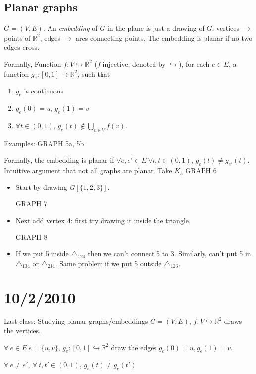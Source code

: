 \documentclass{article}
\begin{document}
\subsection*{Planar graphs}
 $G= (V,E)$.  An \emph{embedding} of $G$ in the plane is just a drawing of $G$.  vertices $\rightarrow$ points of $\mathbb{R}^2$, edges $\rightarrow$ arcs connecting points.  The embedding is planar if no two edges cross.

Formally, Function $f: V \hookrightarrow \mathbb{R}^2$ ($f$ injective, denoted by $\hookrightarrow$), for each $e\in E$, a function $g_e: [0,1] \rightarrow \mathbb{R}^2$, such that 
\begin{enumerate}
 \item $g_e$ is continuous
\item $g_e(0)=u$, $g_e(1)=v$
\item $\forall t \in (0,1)$, $g_e(t) \notin \displaystyle \bigcup_{v \in V} f(v)$.
\end{enumerate}

Examples: GRAPH 5a, 5b

Formally, the embedding is planar if $\forall e, e' \in E ~\forall t, t \in (0,1)$, $g_e(t) \neq g_{e'}(t)$.  Intuitive argument that not all graphs are planar.  Take $K_5$ GRAPH 6
\begin{itemize}
\item Start by drawing $G[\{1,2,3\}]$.

GRAPH 7
\item Next add vertex 4: first try drawing it inside the triangle.

GRAPH 8 

\item If we put 5 inside $\triangle_{124}$ then we can't connect 5 to 3.  Similarly, can't put 5 in $\triangle_{134}$ or $\triangle_{234}$.  Same problem if we put 5 outside $\triangle_{123}$.
\end{itemize}

\section*{10/2/2010}

Last class: Studying planar graphs/embeddings $G=(V,E)$, $f: V \hookrightarrow \mathbb{R}^2$ draws the vertices. 

$\forall ~ e \in E ~e=\{u,v\}$, $g_e:[0,1] \hookrightarrow \mathbb{R}^2$ draw the edges $g_e(0)=u, g_e(1)=v$.

$\forall ~ e \neq e', ~\forall ~t, t'\in (0,1)$, $g_e(t) \neq g_e(t')$
\end{document}
